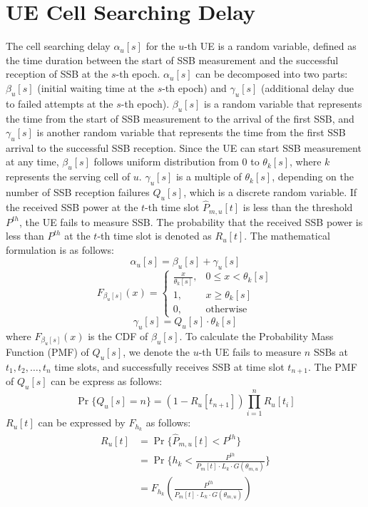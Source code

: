 \section{UE Cell Searching Delay}
The cell searching delay $\alpha_u[s]$ for the $u$-th UE is a random variable, defined as the time duration between the start of SSB measurement and the successful reception of SSB at the $s$-th epoch.
$\alpha_u[s]$ can be decomposed into two parts: $\beta_u[s]$ (initial waiting time at the $s$-th epoch) and $\gamma_u[s]$ (additional delay due to failed attempts at the $s$-th epoch). $\beta_u[s]$ is a random variable that represents the time from the start of SSB measurement to the arrival of the first SSB, and $\gamma_u[s]$ is another random variable that represents the time from the first SSB arrival to the successful SSB reception. Since the UE can start SSB measurement at any time, $\beta_u[s]$ follows uniform distribution from $0$ to $\theta_k[s]$, where $k$ represents the serving cell of $u$. $\gamma_u[s]$ is a multiple of $\theta_k[s]$, depending on the number of SSB reception failures $Q_u[s]$, which is a discrete random variable. If the received SSB power at the $t$-th time slot $\hat{P}_{m, u}[t]$ is less than the threshold $P^{th}$, the UE fails to measure SSB. The probability that the received SSB power is less than $P^{th}$ at the $t$-th time slot is denoted as $R_u[t]$. The mathematical formulation is as follows:
\begin{equation}
    \alpha_u[s] = \beta_u[s] + \gamma_u[s] \label{eq:alpha}
\end{equation}
\begin{equation}
    F_{\beta_u[s]}(x) =
    \begin{cases}
        \frac{x}{\theta_k[s]}, & 0 \leq x < \theta_k[s] \\
        1, & x \geq \theta_k[s] \\
        0, & \text{otherwise}
    \end{cases}
\end{equation}
\begin{equation}
    \gamma_u[s] = Q_u[s] \cdot \theta_k[s]
\end{equation}
where $F_{\beta_u[s]}(x)$ is the CDF of $\beta_u[s]$. To calculate the Probability Mass Function (PMF) of $Q_u[s]$, we denote the $u$-th UE fails to measure $n$ SSBs at $t_1, t_2, \ldots, t_n$ time slots, and successfully receives SSB at time slot $t_{n+1}$. The PMF of $Q_u[s]$ can be express as follows: 
\begin{equation}
    \Pr\{Q_u[s] = n\} = (1 - R_u[t_{n+1}]) \prod_{i=1}^n R_u[t_i]
\end{equation}
$R_u[t]$ can be expressed by $F_{h_k}$ as follows:
\begin{equation}
    \begin{aligned}
        R_u[t]
        &= \Pr\{\hat{P}_{m, u}[t] < P^{th}\} \\
        &= \Pr\{h_k < \frac{P^{th}}{P_m[t] \cdot L_k \cdot G(\theta_{m, u})}\} \\
        &= F_{h_k}(\frac{P^{th}}{P_m[t] \cdot L_k \cdot G(\theta_{m, u})})
    \end{aligned} \label{eq:Ru}
\end{equation}


